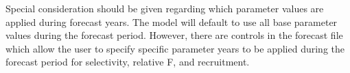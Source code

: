 Special consideration should be given regarding which parameter values are applied during forecast years. The model will default to use all base parameter values during the forecast period. However, there are controls in the forecast file which allow the user to specify specific parameter years to be applied during the forecast period for selectivity, relative F, and recruitment.  



	

